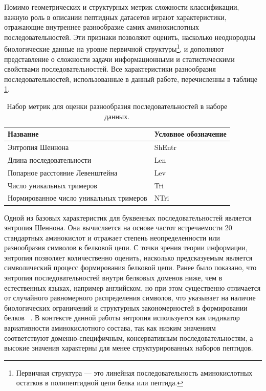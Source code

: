 \documentclass[specification,annotation,times]{itmo-student-thesis}
\begin{document}
Помимо геометрических и структурных метрик сложности классификации, важную роль в описании пептидных датасетов играют характеристики, отражающие внутреннее разнообразие самих аминокислотных последовательностей. Эти признаки позволяют оценить, насколько неоднородны биологические данные на уровне первичной структуры\footnote{Первичная структура — это линейная последовательность аминокислотных остатков в полипептидной цепи белка или пептида.}, и дополняют представление о сложности задачи информационными и статистическими свойствами последовательностей. Все характеристики разнообразия последовательностей, использованные в данный работе, перечисленны в таблице \ref{tab:diversity_metrics}.

\begin{table}[h]
\centering
\begin{tabular}{|l|l|}
\hline
\textbf{Название} & \textbf{Условное обозначение} \\ \hline
Энтропия Шеннона & ShEntr \\ \hline
Длина последовательности & Len \\ \hline
Попарное расстояние Левенштейна & Lev \\ \hline
Число уникальных тримеров & Tri \\ \hline
Нормированное число уникальных тримеров & NTri \\ \hline
\end{tabular}
\caption{Набор метрик для оценки разнообразия последовательностей в наборе данных.}
\label{tab:diversity_metrics}
\end{table}

Одной из базовых характеристик для буквенных последовательностей является энтропия Шеннона. Она вычисляется на основе частот встречаемости 20 стандартных аминокислот и отражает степень неопределенности или разнообразия символов в белковой цепи. С точки зрения теории информации, энтропия позволяет количественно оценить, насколько предсказуемым является символический процесс формирования белковой цепи. Ранее было показано, что энтропия последовательностей внутри белковых доменов ниже, чем в естественных языках, например английском, но при этом существенно отличается от случайного равномерного распределения символов, что указывает на наличие биологических ограничений и структурных закономерностей в формировании белков ~\cite{doi:10.1073/pnas.1814684116}.
В контексте данной работы энтропия используется как индикатор вариативности аминокислотного состава, так как низким значениям соответствуют доменно-специфичным, консервативным последовательностям, а высокие значения характерны для менее структурированных наборов пептидов.
\end{document}
